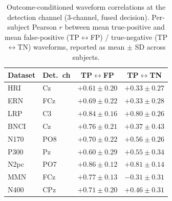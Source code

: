 \begin{table}[t]
\centering
\setlength{\tabcolsep}{6pt}
\caption{Outcome-conditioned waveform correlations at the detection channel (3-channel, fused decision). Per-subject Pearson $r$ between mean true-positive and mean false-positive (TP$\leftrightarrow$FP) / true-negative (TP$\leftrightarrow$TN) waveforms, reported as mean $\pm$ SD across subjects.}
\label{tab:corr}
\begin{tabular}{llcc}
\toprule
Dataset & Det.\ ch & TP$\leftrightarrow$FP & TP$\leftrightarrow$TN \\
\midrule
HRI & Cz & $+0.61 \pm 0.20$ & $+0.33 \pm 0.27$ \\
ERN & FCz & $+0.69 \pm 0.22$ & $+0.33 \pm 0.28$ \\
LRP & C3 & $+0.84 \pm 0.16$ & $+0.80 \pm 0.26$ \\
BNCI & Cz & $+0.76 \pm 0.21$ & $+0.37 \pm 0.43$ \\
N170 & PO8 & $+0.70 \pm 0.22$ & $+0.56 \pm 0.26$ \\
P300 & Pz & $+0.60 \pm 0.29$ & $+0.55 \pm 0.34$ \\
N2pc & PO7 & $+0.86 \pm 0.12$ & $+0.81 \pm 0.14$ \\
MMN & FCz & $+0.77 \pm 0.13$ & $-0.31 \pm 0.31$ \\
N400 & CPz & $+0.71 \pm 0.20$ & $+0.46 \pm 0.31$ \\
\bottomrule
\end{tabular}
\end{table}
